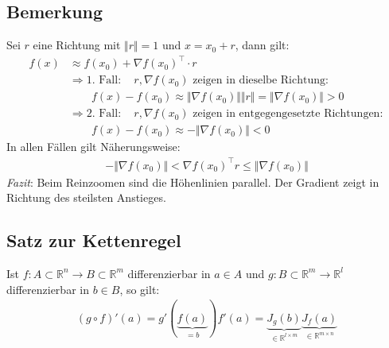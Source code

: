 \documentclass[11pt,a4paper]{book}
\newcommand {\R}	{\mathbb{R}}
\newcommand {\Rn}	{\mathbb{R}^n}
\newcommand {\Rm}	{\mathbb{R}^m}
\newcommand{\1}    	{\mathbbm{1}}
\begin{document}
\subsection{Bemerkung}
Sei \(r\) eine Richtung mit \(\Vert r \Vert = 1\) und \(x = x_0 + r\), dann gilt:
\begin{align*}
	f(x) &\approx f(x_0) + \nabla f(x_0)^\top \cdot r \\
	&\Rightarrow \textrm{1. Fall}: \quad r, \nabla f(x_0) \textrm{ zeigen in dieselbe Richtung}: \\
	&\qquad f(x) - f(x_0) \approx \Vert \nabla f(x_0) \Vert \Vert r \Vert = \Vert \nabla f(x_0) \Vert > 0 \\
	&\Rightarrow \textrm{2. Fall}: \quad r, \nabla f(x_0) \textrm{ zeigen in entgegengesetzte Richtungen}: \\
	&\qquad f(x) - f(x_0) \approx - \Vert \nabla f(x_0) \Vert < 0
\end{align*}
In allen Fällen gilt Näherungsweise:
\begin{align*}
	- \Vert \nabla f(x_0) \Vert  < \nabla f(x_0)^\top r \leqslant \Vert \nabla f(x_0) \Vert
\end{align*}
\textit{Fazit}: Beim Reinzoomen sind die Höhenlinien parallel. Der Gradient zeigt in Richtung des steilsten Anstieges.

\subsection{Satz zur Kettenregel}
Ist \(f: A \subset \Rn \rightarrow B \subset \Rm\) differenzierbar in \(a \in A\) und \(g: B \subset \Rm \rightarrow \R^l\) differenzierbar in \(b \in B\), so gilt:
\begin{align*}
	(g \circ f)'(a) = g'\left(\underbrace{f(a)}_{=b}\right) f'(a) = 
	\underbrace{ J_g (b) }_{\in \R^{l \times m}}
	\underbrace{ J_f (a) }_{\in \R^{m \times n}}
\end{align*}
\end{document}
